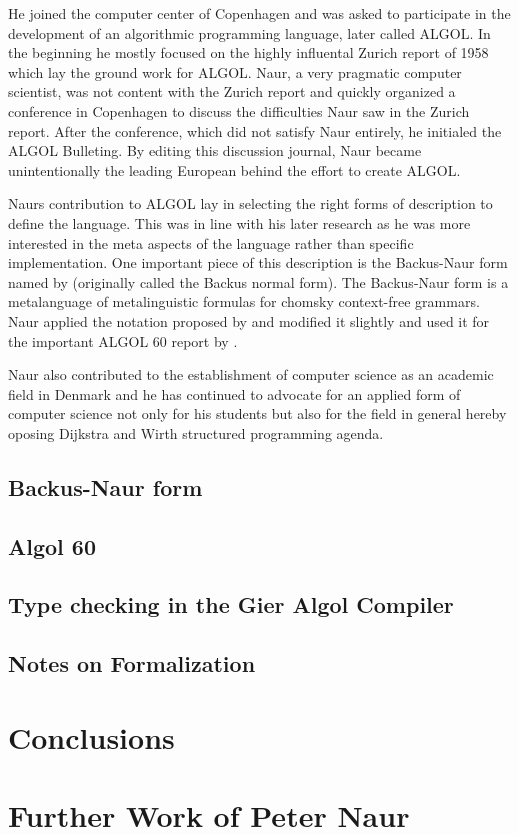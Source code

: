 \documentclass{article}
\begin{document}
He joined the computer center of Copenhagen and was asked to participate in the development of an algorithmic programming language, later called ALGOL. In the beginning he mostly focused on the highly influental Zurich report of 1958 which lay the ground work for ALGOL. Naur, a very pragmatic computer scientist, was not content with the Zurich report and quickly organized a conference in Copenhagen to discuss the difficulties Naur saw in the Zurich report. After the conference, which did not satisfy Naur entirely, he initialed the ALGOL Bulleting. By editing this discussion journal, Naur became unintentionally the leading European behind the effort to create ALGOL. 

Naurs contribution to ALGOL lay in selecting the right forms of description to define the language. This was in line with his later research as he was more interested in the meta aspects of the language rather than specific implementation. One important piece of this description is the Backus-Naur form named by \cite{knuth-ba} (originally called the Backus normal form). The Backus-Naur form is a metalanguage of metalinguistic formulas for chomsky context-free grammars. Naur applied the notation proposed by \cite{Backus1959TheSA} and modified it slightly and used it for the important ALGOL 60 report by \cite{10.1093/comjnl/5.4.349}.

Naur also contributed to the establishment of computer science as an academic field in Denmark and he has continued to advocate for an applied form of computer science not only for his students but also for the field in general hereby oposing Dijkstra and Wirth structured programming agenda.

\subsection{Backus-Naur form}

\subsection{Algol 60}

\subsection{Type checking in the Gier Algol Compiler}

\subsection{Notes on Formalization}

\section{Conclusions}

\section{Further Work of Peter Naur}



\end{document}
